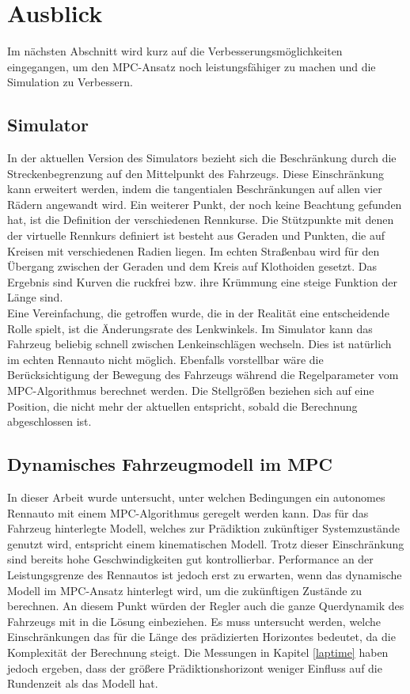 \documentclass{like}
\begin{document}
\section{Ausblick}
Im nächsten Abschnitt wird kurz auf die Verbesserungsmöglichkeiten eingegangen, um den \ac{MPC}-Ansatz noch leistungsfähiger zu machen und die Simulation zu Verbessern.
\subsection{Simulator}
In der aktuellen Version des Simulators bezieht sich die Beschränkung durch die Streckenbegrenzung auf den Mittelpunkt des Fahrzeugs. Diese Einschränkung kann erweitert werden, indem die tangentialen Beschränkungen auf allen vier Rädern angewandt wird. Ein weiterer Punkt, der noch keine Beachtung gefunden hat, ist die Definition der verschiedenen Rennkurse. Die Stützpunkte mit denen der virtuelle Rennkurs definiert ist besteht aus Geraden und Punkten, die auf Kreisen mit verschiedenen Radien liegen. Im echten Straßenbau wird für den Übergang zwischen der Geraden und dem Kreis auf Klothoiden gesetzt. Das Ergebnis sind Kurven die ruckfrei bzw. ihre Krümmung eine steige Funktion der Länge sind. \\
Eine Vereinfachung, die getroffen wurde, die in der Realität eine entscheidende Rolle spielt, ist die Änderungsrate des Lenkwinkels. Im Simulator kann das Fahrzeug beliebig schnell zwischen Lenkeinschlägen wechseln. Dies ist natürlich im echten Rennauto nicht möglich. Ebenfalls vorstellbar wäre die Berücksichtigung der Bewegung des Fahrzeugs während die Regelparameter vom \ac{MPC}-Algorithmus berechnet werden. Die Stellgrößen beziehen sich auf eine Position, die nicht mehr der aktuellen entspricht, sobald die Berechnung abgeschlossen ist.

\subsection{Dynamisches Fahrzeugmodell im MPC}
In dieser Arbeit wurde untersucht, unter welchen Bedingungen ein autonomes Rennauto mit einem \ac{MPC}-Algorithmus geregelt werden kann. Das für das Fahrzeug hinterlegte Modell, welches zur Prädiktion zukünftiger Systemzustände genutzt wird, entspricht einem kinematischen Modell. Trotz dieser Einschränkung sind bereits hohe Geschwindigkeiten gut kontrollierbar. Performance an der Leistungsgrenze des Rennautos ist jedoch erst zu erwarten, wenn das dynamische Modell im \ac{MPC}-Ansatz hinterlegt wird, um die zukünftigen Zustände zu berechnen. An diesem Punkt würden der Regler auch die ganze Querdynamik des Fahrzeugs mit in die Lösung einbeziehen. Es muss untersucht werden, welche Einschränkungen das für die Länge des prädizierten Horizontes bedeutet, da die Komplexität der Berechnung steigt. Die Messungen in Kapitel \ref{laptime} haben jedoch ergeben, dass der größere Prädiktionshorizont weniger Einfluss auf die Rundenzeit als das Modell hat.
\end{document}
